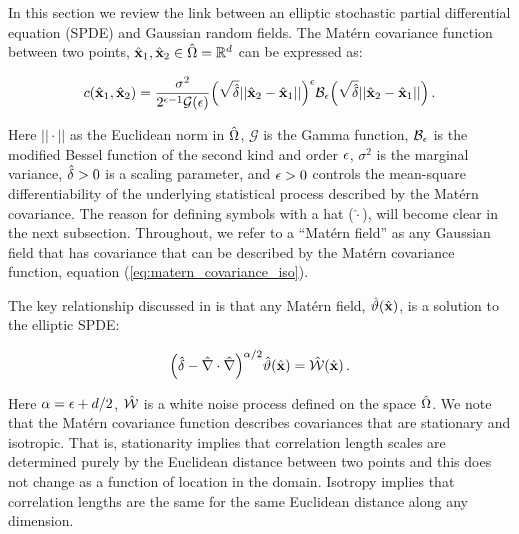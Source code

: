 In this section we review the link between an elliptic stochastic partial
differential equation (SPDE) and Gaussian random fields.
The Mat\'ern covariance function between two points, $\hat{\mathbf{x}}_1,\hat{\mathbf{x}}_2\in\hat{\Omega} =
\mathbb{R}^{d}$ can be expressed as:
\begin{linenomath}\begin{equation}
    c(\hat{\mathbf{x}}_1,\hat{\mathbf{x}}_2) = \dfrac{\sigma^2}{2^{\epsilon-1}
    \mathcal{G}(\epsilon)}
    \Big(\sqrt{\hat{\delta}} ||\hat{\mathbf{x}}_2-\hat{\mathbf{x}}_1||\Big)^{\epsilon}
    \mathcal{B}_{\epsilon}
    \Big(\sqrt{\hat{\delta}} ||\hat{\mathbf{x}}_2-\hat{\mathbf{x}}_1||\Big) \, .
    \label{eq:matern_covariance_iso}
\end{equation}\end{linenomath}
Here $||\cdot||$ as the Euclidean norm in $\hat{\Omega}$,
$\mathcal{G}$ is the Gamma function,
$\mathcal{B}_{\epsilon}$ is the modified
Bessel function of the second kind and order $\epsilon$,
$\sigma^2$ is the
marginal variance, $\hat{\delta}>0$ is a scaling parameter, and $\epsilon>0$
controls the mean-square differentiability of the underlying statistical process
described by the Mat\'ern covariance.
The reason for defining symbols with a hat ($\hat{\cdot}$), will become clear
in the next subsection.
Throughout, we refer to a ``Mat\'ern field'' as any Gaussian field that has
covariance that can be described by the Mat\'ern covariance function,
equation (\ref{eq:matern_covariance_iso}).

The key relationship discussed in \citet{RSSB:RSSB777} is that any Mat\'ern field,
$\hat{\vartheta}(\hat{\mathbf{x}})$, is a solution to the elliptic SPDE:
\begin{linenomath}\begin{equation}
    \Big(\hat{\delta} - \hat{\nabla}\cdot\hat{\nabla}\Big)^{\alpha/2}\hat{\vartheta}(\hat{\mathbf{x}}) =
    \hat{\mathcal{W}}(\hat{\mathbf{x}}) \, .
    \label{eq:spde_iso}
\end{equation}\end{linenomath}
Here $\alpha = \epsilon + d/2$,
$\hat{\mathcal{W}}$ is a white noise process defined on the space $\hat{\Omega}$.
We note that the Mat\'ern covariance function describes covariances that are
stationary and isotropic.
That is, stationarity implies that correlation length scales are determined
purely by the Euclidean distance between two points and this does not change as
a function of location in the domain.
Isotropy implies that correlation lengths are the same for the same Euclidean
distance along any dimension.

